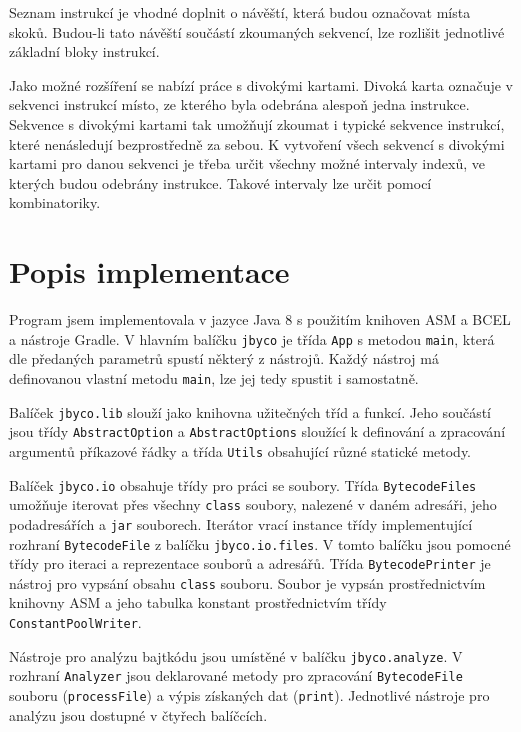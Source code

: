 Seznam instrukcí je vhodné doplnit o návěští, která budou označovat místa skoků. Budou-li tato návěští součástí zkoumaných sekvencí, lze rozlišit jednotlivé základní bloky instrukcí.

Jako možné rozšíření se nabízí práce s divokými kartami.
Divoká karta označuje v sekvenci instrukcí místo, ze kterého byla odebrána alespoň jedna instrukce. Sekvence s divokými kartami tak umožňují zkoumat i typické sekvence instrukcí, které nenásledují bezprostředně za sebou. K vytvoření všech sekvencí s divokými kartami pro danou sekvenci je třeba určit všechny možné intervaly indexů, ve kterých budou odebrány instrukce. Takové intervaly lze určit pomocí kombinatoriky.

\section{Popis implementace}\label{ToolImplementation}

Program jsem implementovala v jazyce Java 8 s použitím knihoven ASM a BCEL a nástroje Gradle. V hlavním balíčku \texttt{jbyco} je třída \texttt{App} s metodou \texttt{main}, která dle předaných parametrů spustí některý z nástrojů. Každý nástroj má definovanou vlastní metodu \texttt{main}, lze jej tedy spustit i samostatně.

Balíček \texttt{jbyco.lib} slouží jako knihovna užitečných tříd a funkcí. Jeho součástí jsou třídy \texttt{AbstractOption} a \texttt{AbstractOptions} sloužící k definování a zpracování argumentů příkazové řádky a třída \texttt{Utils} obsahující různé statické metody. 

Balíček \texttt{jbyco.io} obsahuje třídy pro práci se soubory. Třída \texttt{BytecodeFiles} umožňuje iterovat přes všechny \texttt{class} soubory, nalezené v daném adresáři, jeho podadresářích a \texttt{jar} souborech. Iterátor vrací instance třídy implementující rozhraní \texttt{BytecodeFile} z balíčku \texttt{jbyco.io.files}. V tomto balíčku jsou pomocné třídy pro iteraci a reprezentace souborů a adresářů. Třída \texttt{BytecodePrinter} je nástroj pro vypsání obsahu \texttt{class} souboru. Soubor je vypsán prostřednictvím knihovny ASM a jeho tabulka konstant prostřednictvím třídy \texttt{ConstantPoolWriter}.  

Nástroje pro analýzu bajtkódu jsou umístěné v balíčku \texttt{jbyco.analyze}. V rozhraní \texttt{Analyzer} jsou deklarované metody pro zpracování \texttt{BytecodeFile} souboru (\texttt{processFile}) a výpis získaných dat (\texttt{print}). Jednotlivé nástroje pro analýzu jsou dostupné v čtyřech balíčcích.

